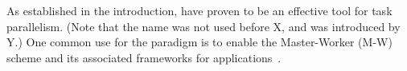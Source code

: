 \documentclass{sig-alternate}
\begin{document}





As established in the introduction, \pilotjobs have proven to be an
effective tool for task parallelism.
(Note that the name \textit{\pilotjob} was not used before X, and was
introduced by Y.) 
One common use for the \pilotjob paradigm is to enable the Master-Worker (M-W)
scheme and its associated frameworks for
applications~\cite{Shao:2000:masterslave}.
\end{document}
